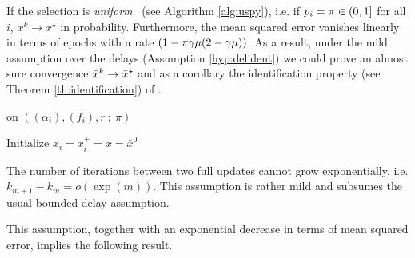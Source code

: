 If the selection is \emph{uniform} \spyU~(see Algorithm \ref{alg:uspy}), i.e. if $p_i=\pi\in(0,1]$ for all $i$, $x^k\to x^\star$ in probability. Furthermore, the mean squared error vanishes linearly in terms of epochs with a rate $(1-\pi\gamma\mu(2-\gamma\mu))$. As a result, under the mild assumption over the delays (Assumption \ref{hyp:delident}) we could prove an almost sure convergence $\bar{x}^k\to \bar{x}^\star$ and as a corollary the identification property (see Theorem \ref{th:identification}) of \spyU.
\begin{algorithm}[t!]
\caption{\textsc{\spyU} on $((\alpha_i),(f_i), r  ~ ; ~  \pi)$}
\label{alg:uspy}
\begin{center}

\begin{tcolorbox}[title=\textsc{Worker } $i$, box align=center]
Initialize $x_i = x_i^+ = x = \bar x^0$\\
\end{tcolorbox}
\end{center}
\end{algorithm}
\begin{assumption}
\label{hyp:delident}
The number of iterations between two full updates cannot grow exponentially, i.e. $k_{m+1}-k_m = o(\exp(m))$.
This assumption is rather mild and subsumes the usual bounded delay assumption.
\end{assumption}

This assumption, together with an exponential decrease in terms of mean squared error, implies the following result.

